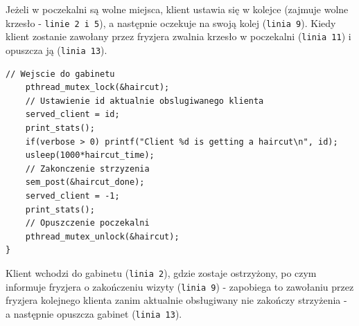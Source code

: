 \documentclass[12pt,a4paper]{article}
\begin{document}
	Jeżeli w poczekalni są wolne miejsca, klient ustawia się w kolejce
	(zajmuje wolne krzesło - \texttt{linie 2 i 5}), a następnie oczekuje
	na swoją kolej (\texttt{linia 9}). Kiedy klient zostanie zawołany
	przez fryzjera zwalnia krzesło w poczekalni (\texttt{linia 11}) i
	opuszcza ją (\texttt{linia 13}).
	
	\begin{center}
		\begin{minipage}{0.8\linewidth}
\begin{lstlisting}[caption = Funkcja klienta 3/3.]
// Wejscie do gabinetu
    pthread_mutex_lock(&haircut);
    // Ustawienie id aktualnie obslugiwanego klienta
    served_client = id;
    print_stats();
    if(verbose > 0) printf("Client %d is getting a haircut\n", id);
    usleep(1000*haircut_time);
    // Zakonczenie strzyzenia
    sem_post(&haircut_done);
    served_client = -1;
    print_stats();
    // Opuszczenie poczekalni
    pthread_mutex_unlock(&haircut);
}
\end{lstlisting}
		\end{minipage}
	\end{center}
	
	Klient wchodzi do gabinetu (\texttt{linia 2}), gdzie zostaje
	ostrzyżony, po czym informuje fryzjera o zakończeniu wizyty
	(\texttt{linia 9}) - zapobiega to zawołaniu przez fryzjera kolejnego
	klienta zanim aktualnie obsługiwany nie zakończy strzyżenia - a 
	następnie opuszcza gabinet (\texttt{linia 13}).
	
	
\end{document}
